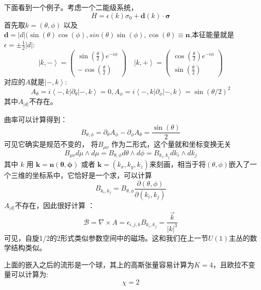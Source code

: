 \documentclass[supercite]{HustGraduPaper}
\newcommand{\bra}[1]{\left\langle #1 \right|}
\newcommand{\ket}[1]{\left| #1 \right\rangle}
\begin{document}
下面看到一个例子。考虑一个二能级系统，
\begin{equation}
H = \epsilon(k)\sigma_0 + \mathbf{d}(k) \cdot \bm{\sigma} 
\end{equation}
首先取$ k = (\theta,\phi)$ 以及 $\mathbf{d} = |d|(\sin(\theta)\cos(\phi), sin(\theta)\sin(\phi), \cos(\theta) \equiv \mathbf{n}$,本征能量就是 $\epsilon = \pm \frac{1}{2} |d|$:
\begin{equation}
\ket{k, -} = \left(\begin{array}{c}
\sin(\frac{\theta}{2})e^{-i\phi} \\ 
-\cos(\frac{\theta}{2})
\end{array} \right) \quad \ket{k, +} = \left(\begin{array}{c}
\cos(\frac{\theta}{2})e^{-i\phi} \\ 
\sin(\frac{\theta}{2})
\end{array} \right)
\end{equation}
对应的$A$就是$\ket{-,k}$:
\begin{equation}
A_\theta = i\bra{-,k} \partial_\theta \ket{-,k} = 0, A_\phi = i\bra{-,k}\partial_\phi \ket{-,k} = \sin(\theta/2)^2
\end{equation}
其中$A_{|d|}$不存在。 

曲率可以计算得到：
\begin{equation}
B_{\theta,\phi} = \partial_\theta A_\phi - \partial_\phi A_\theta = \frac{\sin(\theta)}{2}
\end{equation}
可见它确实是规范不变的，
将$B_{\mu \nu}$ 作为二形式，这个量就和坐标变换无关
\begin{equation}
B_{\mu \nu} d\mu \wedge d\mu = B_{\theta,\phi} d\theta \wedge d\phi = B_{k_i,k_j} dk_i \wedge dk_j
\end{equation}
其中 $k$ 用 $\mathbf{k} = \mathbf{n(\theta,\phi)}$ 或者 $\mathbf{k} = (k_x,k_y,k_z)$来刻画，相当于将$(\theta,\phi)$嵌入了一个三维的坐标系中，它恰好是一个求，可以计算
\begin{equation}
B_{k_i,k_j} = B_{\theta,\phi} \frac{\partial(\theta,\phi)}{\partial(k_i,k_j)}
\end{equation}
$A_{|d|}$不存在，因此很好计算 ：
\begin{equation}
\mathcal{B} = \nabla \times A = \epsilon_{i,j,k}B_{k_i,k_j} = \frac{\vec{k}}{|k|^3} 
\end{equation}
可见，自旋1/2的2形式类似参数空间中的磁场。这和我们在上一节$U(1)$主丛的数学结构类似。

上面的嵌入之后的流形是一个球，其上的高斯张量容易计算为$K = 4$，且欧拉不变量可以计算为:
\begin{equation}
\chi = 2
\end{equation}
\end{document}
